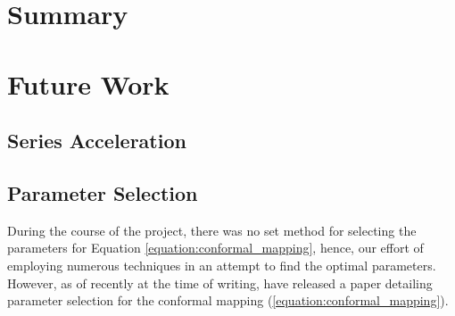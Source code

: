 \documentclass[a4paper]{report}
\begin{document}
\section{Summary}

\section{Future Work}

\subsection{Series Acceleration}

\subsection{Parameter Selection}
During the course of the project, there was no set method for selecting the parameters for Equation \ref{equation:conformal_mapping}, hence, our effort of employing numerous techniques in an attempt to find the optimal parameters. However, as of recently at the time of writing, \citet{boyarchenko2024efficient} have released a paper detailing parameter selection for the conformal mapping (\ref{equation:conformal_mapping}).





\end{document}
